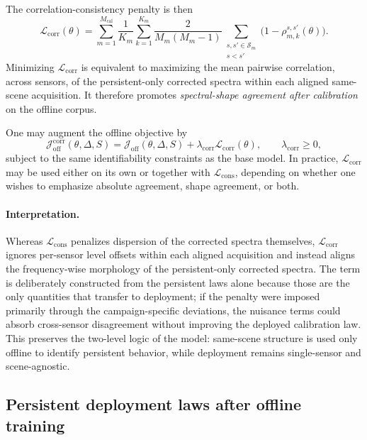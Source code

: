 The correlation-consistency penalty is then
\begin{equation}
\mathcal L_{\mathrm{corr}}(\theta)
=
\sum_{m=1}^{M_{\mathrm{cal}}}
\frac{1}{K_m}
\sum_{k=1}^{K_m}
\frac{2}{M_m(M_m-1)}
\sum_{\substack{s,s'\in\mathcal S_m\\ s<s'}}
\bigl(
1-\rho_{m,k}^{s,s'}(\theta)
\bigr).
\label{eq:Lcorr}
\end{equation}
Minimizing $\mathcal L_{\mathrm{corr}}$ is equivalent to maximizing the mean
pairwise correlation, across sensors, of the persistent-only corrected spectra
within each aligned same-scene acquisition. It therefore promotes
\emph{spectral-shape agreement after calibration} on the offline corpus.

One may augment the offline objective by
\begin{equation}
\mathcal J_{\mathrm{off}}^{\mathrm{corr}}(\theta,\Delta,S)
=
\mathcal J_{\mathrm{off}}(\theta,\Delta,S)
+
\lambda_{\mathrm{corr}}
\mathcal L_{\mathrm{corr}}(\theta),
\qquad
\lambda_{\mathrm{corr}}\ge 0,
\label{eq:Joff-corr}
\end{equation}
subject to the same identifiability constraints as the base model. In
practice, $\mathcal L_{\mathrm{corr}}$ may be used either on its own or
together with $\mathcal L_{\mathrm{cons}}$, depending on whether one wishes to
emphasize absolute agreement, shape agreement, or both.

\paragraph{Interpretation.}
Whereas $\mathcal L_{\mathrm{cons}}$ penalizes dispersion of the corrected
spectra themselves, $\mathcal L_{\mathrm{corr}}$ ignores per-sensor level
offsets within each aligned acquisition and instead aligns the frequency-wise
morphology of the persistent-only corrected spectra. The term is deliberately
constructed from the persistent laws alone because those are the only
quantities that transfer to deployment; if the penalty were imposed primarily
through the campaign-specific deviations, the nuisance terms could absorb
cross-sensor disagreement without improving the deployed calibration law. This
preserves the two-level logic of the model: same-scene structure is used only
offline to identify persistent behavior, while deployment remains single-sensor
and scene-agnostic.

\subsection{Persistent deployment laws after offline training}

